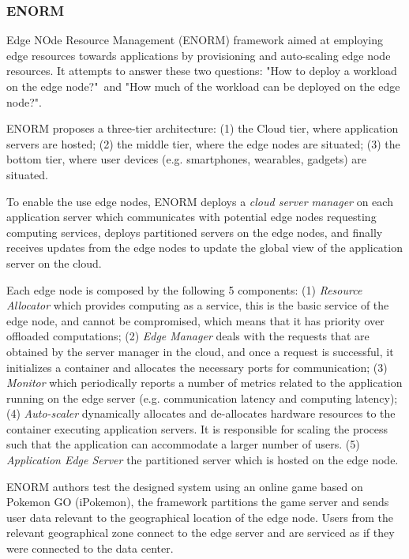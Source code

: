\subsubsection{ENORM}

Edge NOde Resource Management \cite{wang2017enorm} (ENORM) framework aimed at employing edge resources towards applications by provisioning and auto-scaling edge node resources. It attempts to answer these two questions: "How to deploy a workload on the edge node?"\ and "How much of the workload can be deployed on the edge node?".

ENORM proposes a three-tier architecture: (1) the Cloud tier, where application servers are hosted; (2) the middle tier, where the edge nodes are situated; (3) the bottom tier, where user devices (e.g. smartphones, wearables, gadgets) are situated. 

To enable the use edge nodes, ENORM deploys a \textit{cloud server manager} on each application server which communicates with potential edge nodes requesting computing services, deploys partitioned servers on the edge nodes, and finally receives updates from the edge nodes to update the global view of the application server on the cloud.

Each edge node is composed by the following 5 components: (1) \textit{Resource Allocator} which provides computing as a service, this is the basic service of the edge node, and cannot be compromised, which means that it has priority over offloaded computations; (2) \textit{Edge Manager} deals with the requests that are obtained by the server manager in the cloud, and once a request is successful, it initializes a container and allocates the necessary ports for communication; (3) \textit{Monitor} which periodically reports a number of metrics related to the application running on the edge server (e.g. communication latency and computing latency); (4) \textit{Auto-scaler} dynamically allocates and de-allocates hardware resources to the container executing application servers. It is responsible for scaling the process such that the application can accommodate a larger number of users. (5) \textit{Application Edge Server} the partitioned server which is hosted on the edge node.

ENORM authors test the designed system using an online game based on Pokemon GO (iPokemon)\cite{pokemonGo}, the framework partitions the game server and sends  user data relevant to the geographical location of the edge node. Users from the relevant geographical zone connect to the edge server and are serviced as if they were connected to the data center. 


